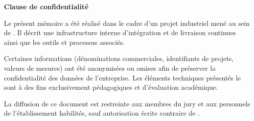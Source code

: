\thispagestyle{empty}
\vspace*{4cm}
\begin{center}
{\Large \bfseries Clause de confidentialité}
\end{center}
\vspace{1cm}

\noindent
Le présent mémoire a été réalisé dans le cadre d'un projet industriel mené au
sein de \Entreprise. Il décrit une infrastructure interne d'intégration et de
livraison continues ainsi que les outils et processus associés.

\medskip
\noindent
Certaines informations (dénominations commerciales, identifiants de projets, valeurs de mesures) ont été anonymisées ou
omises afin de préserver la confidentialité des données de l'entreprise. Les
éléments techniques présentés le sont à des fins exclusivement pédagogiques et
d'évaluation académique.

\medskip
\noindent
La diffusion de ce document est restreinte aux membres du jury et aux
personnels de l'établissement habilités, sauf autorisation écrite contraire de
\Entreprise.

\vfill
\clearpage
